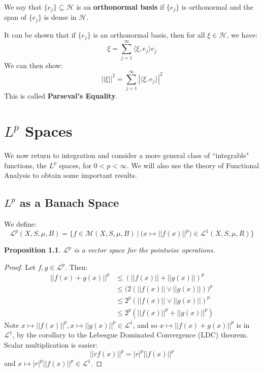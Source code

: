 \documentclass[a4paper,12pt]{report}
\newcommand{\ms}[1]{\mathscr{#1}}
\newcommand{\sse} {\subseteq}
\newtheorem{prop}[theorem]{Proposition}
\newenvironment{definition}[1][Definition.]{\begin{trivlist}
\item[\hskip \labelsep {\bfseries #1}]}{\end{trivlist}}
\begin{document}
	\begin{definition}
	We say that $\{e_j\} \sse \ms{H}$ is an \textbf{orthonormal basis} if $\{e_j\}$ is orthonormal and the span of $\{e_j\}$ is dense in $\ms{H}$.
	\end{definition}
	
	\noindent It can be shown that if $\{e_j\}$ is an orthonormal basis, then for all $\xi \in \ms{H}$, we have:
	\[ \xi = \sum_{j=1}^\infty \langle \xi, e_j \rangle e_j \] 
	We can then show:
	\[ ||\xi||^2 = \sum_{j=1}^\infty |\langle \xi, e_j \rangle|^2 \]
	This is called \textbf{Parseval's Equality}.
	
	
	\newpage
	\chapter{$L^p$ Spaces}
	We now return to integration and consider a more general class of ``integrable" functions, the $L^p$ spaces, for $0 < p < \infty$. We will also use the theory of Functional Analysis to obtain some important results. 
	
	\section{$L^p$ as a Banach Space}
	
	\begin{definition}
	We define:
	\[ \ms{L}^p(X, S, \mu, B) = \bigg\{ f \in \ms{M}(X, S, \mu, B) ~\bigg|~ \big(x \mapsto ||f(x)||^p \big) \in \ms{L}^1(X, S, \mu, R) \bigg\} \]
	\end{definition}
	
	\begin{prop}
	$\ms{L}^p$ is a vector space for the pointwise operations. 
	\end{prop}
	\begin{proof}
	Let $f, g \in \ms{L}^p$. Then:
	\begin{align*} 
	||f(x) + g(x)||^p &\leq (||f(x)|| + ||g(x)||)^p \\
	&\leq \big( 2 (||f(x)|| \vee ||g(x)||)\big)^p \\
	&\leq 2^p (||f(x)|| \vee ||g(x)||)^p \\
	&\leq 2^p (||f(x)||^p + ||g(x)||^p)
	\end{align*}
	Note $x \mapsto ||f(x)||^p, x \mapsto ||g(x)||^p \in \ms{L}^1$, and so $x \mapsto ||f(x) + g(x)||^p$ is in $\ms{L}^1$, by the corollary to the Lebesgue Dominated Convergence (LDC) theorem. Scalar multiplication is easier:
	\[ ||rf(x)||^p = |r|^p||f(x)||^p \]
	and $x \mapsto |r|^p ||f(x)||^p \in \ms{L}^1$. 
	\end{proof}
	
\end{document}
